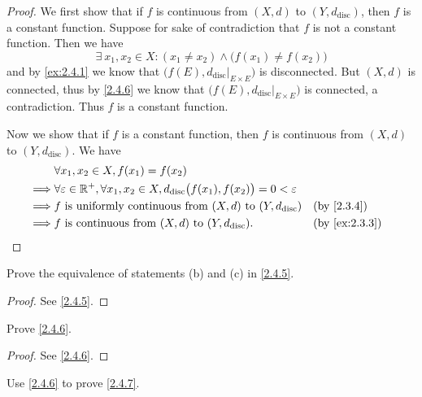 \begin{proof}
  We first show that if \(f\) is continuous from \((X, d)\) to \((Y, d_{\text{disc}})\), then \(f\) is a constant function.
  Suppose for sake of contradiction that \(f\) is not a constant function.
  Then we have
  \[
    \exists\ x_1, x_2 \in X : (x_1 \neq x_2) \land \big(f(x_1) \neq f(x_2)\big)
  \]
  and by \cref{ex:2.4.1} we know that \(\big(f(E), d_{\text{disc}}|_{E \times E}\big)\) is disconnected.
  But \((X, d)\) is connected, thus by \cref{2.4.6} we know that \(\big(f(E), d_{\text{disc}}|_{E \times E}\big)\) is connected, a contradiction.
  Thus \(f\) is a constant function.

  Now we show that if \(f\) is a constant function, then \(f\) is continuous from \((X, d)\) to \((Y, d_{\text{disc}})\).
  We have
  \begin{align*}
             & \forall x_1, x_2 \in X, f(x_1) = f(x_2)                                                                                                          \\
    \implies & \forall \varepsilon \in \R^+, \forall x_1, x_2 \in X, d_{\text{disc}}\big(f(x_1), f(x_2)\big) = 0 < \varepsilon                                  \\
    \implies & f \text{ is uniformly continuous from } (X, d) \text{ to } (Y, d_{\text{disc}})                                 &  & \by{2.3.4}                  \\
    \implies & f \text{ is continuous from } (X, d) \text{ to } (Y, d_{\text{disc}}).                                          &  & \text{(by \cref{ex:2.3.3})}
  \end{align*}
\end{proof}

\begin{ex}\label{ex:2.4.3}
  Prove the equivalence of statements (b) and (c) in \cref{2.4.5}.
\end{ex}

\begin{proof}
  See \cref{2.4.5}.
\end{proof}

\begin{ex}\label{ex:2.4.4}
  Prove \cref{2.4.6}.
\end{ex}

\begin{proof}
  See \cref{2.4.6}.
\end{proof}

\begin{ex}\label{ex:2.4.5}
  Use \cref{2.4.6} to prove \cref{2.4.7}.
\end{ex}

